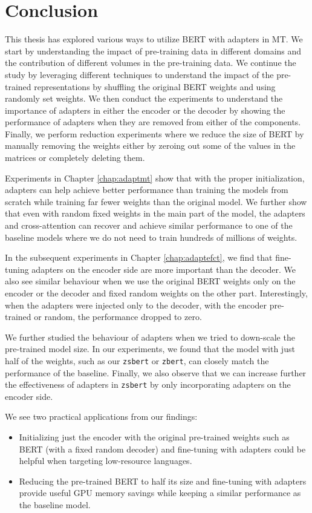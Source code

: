 \chapter*{Conclusion}
This thesis has explored various ways to utilize BERT with adapters in MT. We start by understanding the impact of pre-training data in different domains and the contribution of different volumes in the pre-training data. We continue the study by leveraging different techniques to understand the impact of the pre-trained representations by shuffling the original BERT weights and using randomly set weights. We then conduct the experiments to understand the importance of adapters in either the encoder or the decoder by showing the performance of adapters when they are removed from either of the components. Finally, we perform reduction experiments where we reduce the size of BERT by manually removing the weights either by zeroing out some of the values in the matrices or completely deleting them.

Experiments in Chapter \ref{chap:adaptmt} show that with the proper initialization, adapters can help achieve better performance than training the models from scratch while training far fewer weights than the original model. We further show that even with random fixed weights in the main part of the model, the adapters and cross-attention can recover and achieve similar performance to one of the baseline models where we do not need to train hundreds of millions of weights.

In the subsequent experiments in Chapter \ref{chap:adaptefct}, we find that fine-tuning adapters on the encoder side are more important than the decoder. We also see similar behaviour when we use the original BERT weights only on the encoder or the decoder and fixed random weights on the other part. Interestingly, when the adapters were injected only to the decoder, with the encoder pre-trained or random, the performance dropped to zero.

We further studied the behaviour of adapters when we tried to down-scale the pre-trained model size. In our experiments, we found that the model with just half of the weights, such as our \texttt{zsbert} or \texttt{zbert}, can closely match the performance of the baseline. Finally, we also observe that we can increase further the effectiveness of adapters in \texttt{zsbert} by only incorporating adapters on the encoder side.

We see two practical applications from our findings:
\begin{itemize}
    \item Initializing just the encoder with the original pre-trained weights such as BERT (with a fixed random decoder) and fine-tuning with adapters could be helpful when targeting low-resource languages.
    \item Reducing the pre-trained BERT to half its size and fine-tuning with adapt\-ers provide useful GPU memory savings while keeping a similar performance as the baseline model.
\end{itemize}

